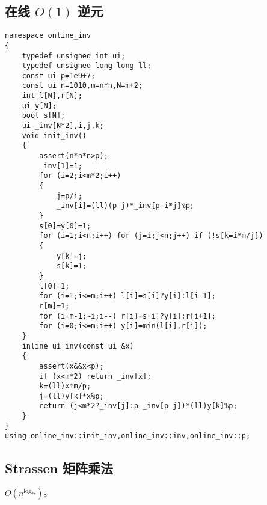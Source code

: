 \documentclass[12pt]{ctexart}
\begin{document}
\subsection{在线 $O(1)$ 逆元}

\begin{lstlisting}
namespace online_inv
{
	typedef unsigned int ui;
	typedef unsigned long long ll;
	const ui p=1e9+7;
	const ui n=1010,m=n*n,N=m+2;
	int l[N],r[N];
	ui y[N];
	bool s[N];
	ui _inv[N*2],i,j,k;
	void init_inv()
	{
		assert(n*n*n>p);
		_inv[1]=1;
		for (i=2;i<m*2;i++)
		{
			j=p/i;
			_inv[i]=(ll)(p-j)*_inv[p-i*j]%p;
		}
		s[0]=y[0]=1;
		for (i=1;i<n;i++) for (j=i;j<n;j++) if (!s[k=i*m/j])
		{
			y[k]=j;
			s[k]=1;
		}
		l[0]=1;
		for (i=1;i<=m;i++) l[i]=s[i]?y[i]:l[i-1];
		r[m]=1;
		for (i=m-1;~i;i--) r[i]=s[i]?y[i]:r[i+1];
		for (i=0;i<=m;i++) y[i]=min(l[i],r[i]);
	}
	inline ui inv(const ui &x)
	{
		assert(x&&x<p);
		if (x<m*2) return _inv[x];
		k=(ll)x*m/p;
		j=(ll)y[k]*x%p;
		return (j<m*2?_inv[j]:p-_inv[p-j])*(ll)y[k]%p;
	}
}
using online_inv::init_inv,online_inv::inv,online_inv::p;
\end{lstlisting}

\subsection{Strassen 矩阵乘法}

$O(n^{\log_27})$。
\end{document}
